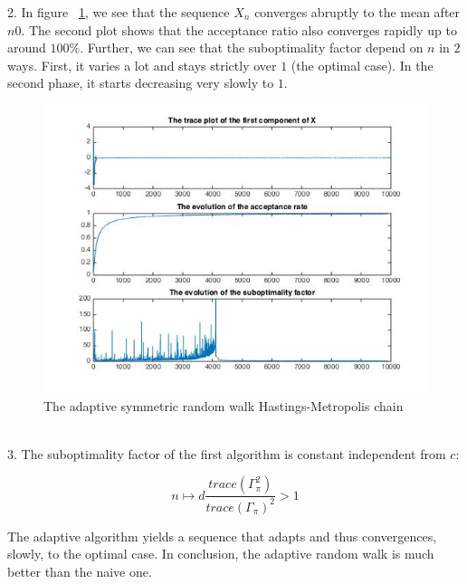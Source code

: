	2.  In figure ~\ref{arwHM}, we see that the sequence $X_n$ converges abruptly to the mean after $n0$. The second plot shows that the acceptance ratio also converges rapidly up to around $100\%$. Further, we can see that the suboptimality factor depend on $n$ in $2$ ways. First, it varies a lot and stays strictly over $1$ (the optimal case). In the second phase, it starts decreasing very slowly to $1$.
	\begin{figure}
		\centering
		\includegraphics[scale=.5]{arwHM}
		\caption{The adaptive symmetric random walk Hastings-Metropolis chain}
		\label{arwHM}
	\end{figure}
	~\\
	
	3. The suboptimality factor of the first algorithm is constant independent from $c$:
	
	$$n \mapsto d\frac{trace(\Gamma_{\pi} ^2) }{trace(\Gamma_{\pi})^2}>1$$
	
	The adaptive algorithm yields a sequence that adapts and thus convergences, slowly, to the optimal case. In conclusion, the adaptive random walk is much better than the naive one.
	
	
